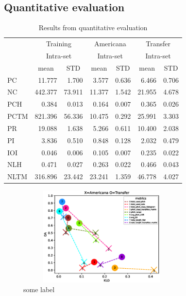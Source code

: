 \documentclass{IEEEtran}
\begin{document}
    \subsection{Quantitative evaluation}
        \begin{table}[]
            \begin{center}
            \caption{
                Results from quantitative evaluation
                \label{tab:data}
            }
            \begin{tabular}{l|rr|rr|rr}
            \multirow{3}{*}{} &
            \multicolumn{2}{c|}{Training} &
            \multicolumn{2}{c|}{Americana} &
            \multicolumn{2}{c}{Transfer} \\ \cline{2-7} 
            &
            \multicolumn{2}{c|}{Intra-set} &
            \multicolumn{2}{c|}{Intra-set} &
            \multicolumn{2}{c}{Intra-set} \\ \cline{2-7} 
            &
            \multicolumn{1}{c|}{mean} &
            \multicolumn{1}{c|}{STD} &
            \multicolumn{1}{c|}{mean} &
            \multicolumn{1}{c|}{STD} &
            \multicolumn{1}{c|}{mean} &
            \multicolumn{1}{c}{STD} \\ \hline
            PC   & 11.777  & 1.700  & 3.577  & 0.636 & 6.466  & 0.706 \\
            NC   & 442.377 & 73.911 & 11.377 & 1.542 & 21.955 & 4.678 \\
            PCH  & 0.384   & 0.013  & 0.164  & 0.007 & 0.365  & 0.026 \\
            PCTM & 821.396 & 56.336 & 10.475 & 0.292 & 25.991 & 3.303 \\
            PR   & 19.088  & 1.638  & 5.266  & 0.611 & 10.400 & 2.038 \\
            PI   & 3.836   & 0.510  & 0.848  & 0.128 & 2.032  & 0.479 \\
            IOI  & 0.046   & 0.006  & 0.105  & 0.007 & 0.235  & 0.022 \\
            NLH  & 0.471   & 0.027  & 0.263  & 0.022 & 0.466  & 0.043 \\
            NLTM & 316.896 & 23.442 & 23.241 & 1.359 & 46.778 & 4.027
            \end{tabular}
            \end{center}
            \end{table}

            \begin{figure}
                \centering
                \includegraphics[width=8.5cm, height=5cm]{gen_intra_gen_training_inter}
                \caption{some label}
                \label{fig:gen_intra_gen_training_inter}
            \end{figure} 
            
\end{document}
